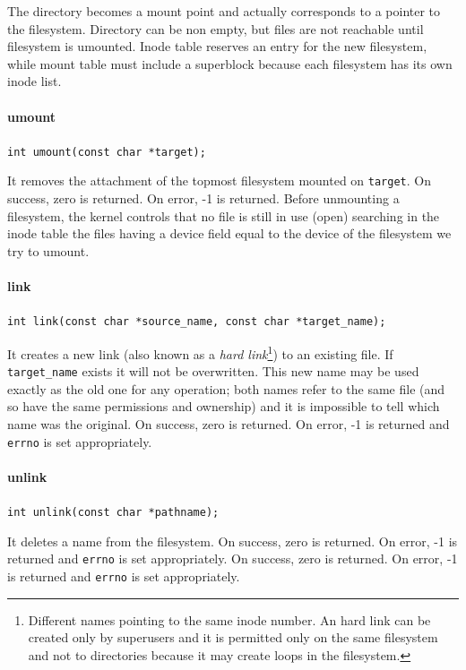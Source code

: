 The directory becomes a mount point and actually corresponds to a pointer to the filesystem. Directory can be non empty, but files are not reachable until filesystem is umounted. Inode table reserves an entry for the new filesystem, while mount table must include a superblock because each filesystem has its own inode list.

\paragraph{umount}
\texttt{int umount(const char *target);}

It removes the attachment of the topmost filesystem mounted on \texttt{target}.  On success, zero is
returned. On error, -1 is returned. Before unmounting a filesystem, the kernel controls that no file is still in use (open) searching in the inode table the files having a device field equal to the device of the filesystem we try to umount.

\paragraph{link}
\texttt{int link(const char *source\_name, const char *target\_name);}

It creates a new link (also known as a \emph{hard link}\footnote{Different names pointing to the same inode number. An hard link can be created only by superusers and it is permitted only on the same filesystem and not to directories because it may create loops in the filesystem.}) to an existing file. If \texttt{target\_name} exists it will not be overwritten. This new name may be used exactly as the old one for any operation; both names refer to the same file (and so have the same permissions and ownership) and it is impossible to tell which name was the original. On success, zero is returned. On error, -1 is returned and \texttt{errno} is set appropriately.

\paragraph{unlink}
\texttt{int unlink(const char *pathname);}

It deletes a name from the filesystem. On success, zero is returned. On error, -1 is returned and \texttt{errno} is set appropriately.
On success, zero is returned. On error, -1 is returned and \texttt{errno} is set appropriately.

